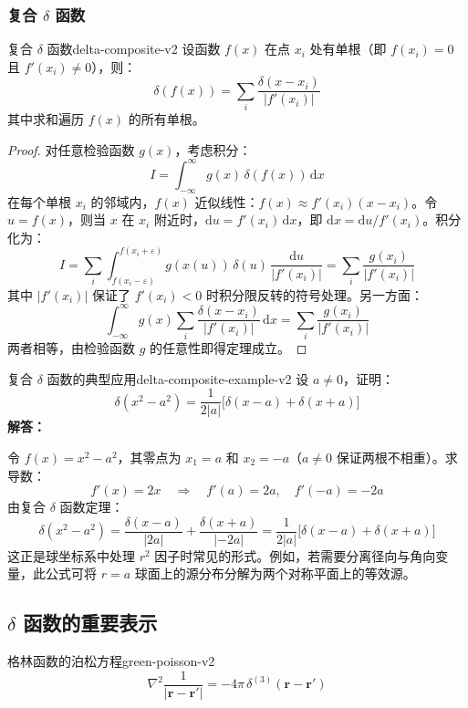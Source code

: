 \documentclass[11pt,a4paper,openany,oneside]{book}
\newcommand{\diff}{\mathrm{d}}
\newcommand{\eps}{\varepsilon}
\newcommand{\vect}[1]{\bm{#1}}
\newcommand{\lap}{\nabla^2}
\newcommand{\difficulty}[1]{\marginnote{\textcolor{red}{\textbf{[#1]}}}}
\begin{document}
\subsubsection{复合 $\delta$ 函数}

\begin{theorem}{复合 $\delta$ 函数}{delta-composite-v2}
设函数 $f(x)$ 在点 $x_i$ 处有单根（即 $f(x_i)=0$ 且 $f'(x_i) \neq 0$），则：
\[
\delta(f(x)) = \sum_i \frac{\delta(x-x_i)}{|f'(x_i)|}
\]
其中求和遍历 $f(x)$ 的所有单根。
\end{theorem}

\begin{proof}
对任意检验函数 $g(x)$，考虑积分：
\[
I = \int_{-\infty}^{\infty} g(x)\,\delta(f(x))\,\diff x
\]
在每个单根 $x_i$ 的邻域内，$f(x)$ 近似线性：$f(x) \approx f'(x_i)(x-x_i)$。令 $u = f(x)$，则当 $x$ 在 $x_i$ 附近时，$\diff u = f'(x_i)\,\diff x$，即 $\diff x = \diff u/f'(x_i)$。积分化为：
\[
I = \sum_i \int_{f(x_i-\eps)}^{f(x_i+\eps)} g(x(u))\,\delta(u)\,\frac{\diff u}{|f'(x_i)|} = \sum_i \frac{g(x_i)}{|f'(x_i)|}
\]
其中 $|f'(x_i)|$ 保证了 $f'(x_i)<0$ 时积分限反转的符号处理。另一方面：
\[
\int_{-\infty}^{\infty} g(x) \sum_i \frac{\delta(x-x_i)}{|f'(x_i)|}\,\diff x = \sum_i \frac{g(x_i)}{|f'(x_i)|}
\]
两者相等，由检验函数 $g$ 的任意性即得定理成立。
\end{proof}

\begin{example}{复合 $\delta$ 函数的典型应用}{delta-composite-example-v2}
\difficulty{基础}
设 $a \neq 0$，证明：
\[
\delta(x^2 - a^2) = \frac{1}{2|a|}\bigl[\delta(x-a) + \delta(x+a)\bigr]
\]
\tcblower
\textbf{解答：}

令 $f(x) = x^2 - a^2$，其零点为 $x_1 = a$ 和 $x_2 = -a$（$a \neq 0$ 保证两根不相重）。求导数：
\[
f'(x) = 2x \quad\Rightarrow\quad f'(a) = 2a, \quad f'(-a) = -2a
\]
由复合 $\delta$ 函数定理：
\[
\delta(x^2-a^2) = \frac{\delta(x-a)}{|2a|} + \frac{\delta(x+a)}{|-2a|} = \frac{1}{2|a|}\bigl[\delta(x-a) + \delta(x+a)\bigr]
\]
这正是球坐标系中处理 $r^2$ 因子时常见的形式。例如，若需要分离径向与角向变量，此公式可将 $r=a$ 球面上的源分布分解为两个对称平面上的等效源。
\end{example}

\subsection{\texorpdfstring{$\delta$}{δ} 函数的重要表示}

\begin{theorem}{格林函数的泊松方程}{green-poisson-v2}
\[
\lap \frac{1}{|\vect{r} - \vect{r}'|} = -4\pi \, \delta^{(3)}(\vect{r} - \vect{r}')
\]
\end{theorem}
\end{document}
